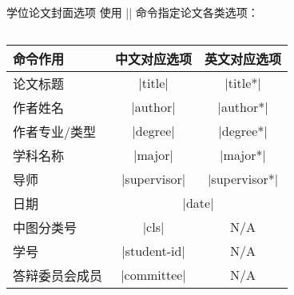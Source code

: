 \begin{frame}[fragile]{学位论文封面选项}
  使用 || 命令指定论文各类选项：
  \begin{columns}
    \begin{column}{.6\textwidth}
      \begin{table}[h]
      \centering
      \tiny
      \begin{tabular}{lcc}
        \toprule
        命令作用 & 中文对应选项 & 英文对应选项 \\
        \midrule
        论文标题 & |title| & |title*| \\
        作者姓名 & |author| &|author*| \\
        作者专业/类型 & |degree| &|degree*| \\
        学科名称 & |major| & |major*| \\
        导师 & |supervisor| & |supervisor*|\\
        日期 & \multicolumn{2}{c}{|date|}\\
        中图分类号 & |cls| & N/A \\
        学号 & |student-id| & N/A \\
        答辩委员会成员 & |committee| & N/A \\
        \bottomrule
      \end{tabular}
      \end{table}
    \end{column}
    \begin{column}{.35\textwidth}
      \begin{texcode}[gobble=8,keywords={hustsetup}]
      \end{texcode}
    \end{column}
  \end{columns}
\end{frame}
